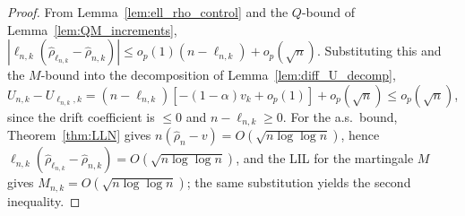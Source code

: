 \begin{proof}
From Lemma~\ref{lem:ell_rho_control} and the $Q$-bound of
Lemma~\ref{lem:QM_increments},
$|\ell_{n,k}(\hat{\rho}_{\ell_{n,k}}-\hat{\rho}_{n,k})| \le o_p(1)(n-\ell_{n,k}) + o_p(\sqrt n)$.
Substituting this and the $M$-bound into the decomposition of
Lemma~\ref{lem:diff_U_decomp},
$U_{n,k}-U_{\ell_{n,k},k} = (n-\ell_{n,k})[-(1-\alpha)v_k+o_p(1)] + o_p(\sqrt n)
 \le o_p(\sqrt n)$, since the drift coefficient is $\le0$ and $n-\ell_{n,k}\ge0$.
For the a.s.\ bound, Theorem~\ref{thm:LLN} gives $n(\hat{\rho}_n-v)=O(\sqrt{n\log\log n})$,
hence $\ell_{n,k}(\hat{\rho}_{\ell_{n,k}}-\hat{\rho}_{n,k})=O(\sqrt{n\log\log n})$,
and the LIL for the martingale $M$ gives $M_{n,k}=O(\sqrt{n\log\log n})$; the same
substitution yields the second inequality.
\end{proof}

